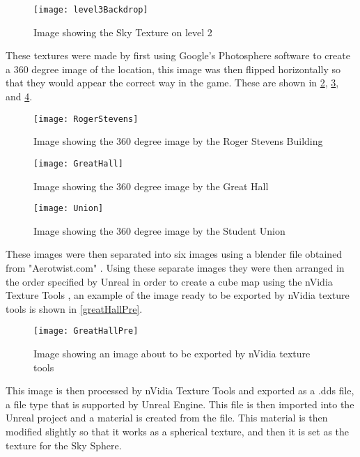 \begin{figure}[H]
	\texttt{[image: level3Backdrop]}
	\centering
	\caption{Image showing the Sky Texture on level 2}
	\label{fig:level3Backdrop}
\end{figure}

These textures were made by first using Google's Photosphere software to create a 360 degree image of the location, this image was then flipped horizontally so that they would appear the correct way in the game. These are shown in \ref{fig:rogerStevens}, \ref{fig:greatHall}, and \ref{fig:union}. 

\begin{figure}[H]
	\texttt{[image: RogerStevens]}
	\centering
	\caption{Image showing the 360 degree image by the Roger Stevens Building}
	\label{fig:rogerStevens}
\end{figure}

\begin{figure}[H]
	\texttt{[image: GreatHall]}
	\centering
	\caption{Image showing the 360 degree image by the Great Hall}
	\label{fig:greatHall}
\end{figure}

\begin{figure}[H]
	\texttt{[image: Union]}
	\centering
	\caption{Image showing the 360 degree image by the Student Union}
	\label{fig:union}
\end{figure}

These images were then separated into six images using a blender file obtained from "Aerotwist.com" \cite{aerotwist}. Using these separate images they were then arranged in the order specified by Unreal in order to create a cube map using the nVidia Texture Tools \cite{unrealCubeMaps}, an example of the image ready to be exported by nVidia texture tools is shown in \ref{greatHallPre}.

\begin{figure}[H]
	\texttt{[image: GreatHallPre]}
	\centering
	\caption{Image showing an image about to be exported by nVidia texture tools}
	\label{fig:greatHallPre}
\end{figure}

This image is then processed by nVidia Texture Tools and exported as a .dds file, a file type that is supported by Unreal Engine. This file is then imported into the Unreal project and a material is created from the file. This material is then modified slightly so that it works as a spherical texture, and then it is set as the texture for the Sky Sphere.

